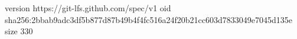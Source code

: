 version https://git-lfs.github.com/spec/v1
oid sha256:2bbab9adc3df5b877d87b49b4f4fc516a24f20b21cc603d7833049e7045d135e
size 330
